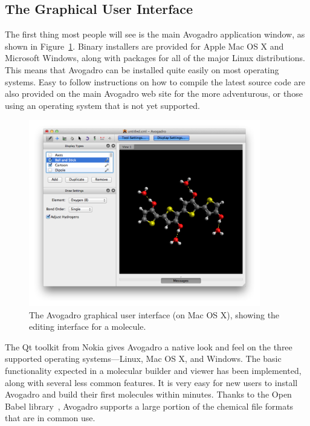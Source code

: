 \documentclass[10pt]{bmc_article}
\newenvironment{bmcformat}{\begin{raggedright}
\baselineskip20pt\sloppy\setboolean{publ}{false}}{\end{raggedright}
\baselineskip20pt\sloppy}
\begin{document}
\begin{bmcformat}
\section{The Graphical User Interface}

The first thing most people will see is the main Avogadro application
window, as shown in Figure~\ref{f:avogadrogui}. Binary installers are provided
for Apple Mac OS X and Microsoft Windows, along with packages for all of the
major Linux distributions. This means that Avogadro can be installed quite
easily on most operating systems. Easy to follow instructions on how to compile
the latest source code are also provided on the main Avogadro web
site\cite{CompileWindows,CompileLinux} for the more adventurous, or those using
an operating system that is not yet supported.

\begin{figure}
  \begin{center}
    \includegraphics[width=0.9\textwidth]{images/avogadro-drawing}
  \end{center}
  \caption{The Avogadro graphical user interface (on Mac OS X), showing the
editing interface
for a molecule.}
  \label{f:avogadrogui}
\end{figure}

The Qt toolkit from Nokia gives Avogadro a native look and feel on the three
supported operating systems---Linux, Mac OS X, and Windows. The basic
functionality expected in a molecular builder and viewer has been implemented,
along with several less common features. It is very easy for new users to
install Avogadro and build their
first molecules within minutes. Thanks to the Open Babel library~\cite{OpenBabel}, Avogadro
supports a large portion of the chemical file formats that are in
common use.


\end{bmcformat}
\end{document}

